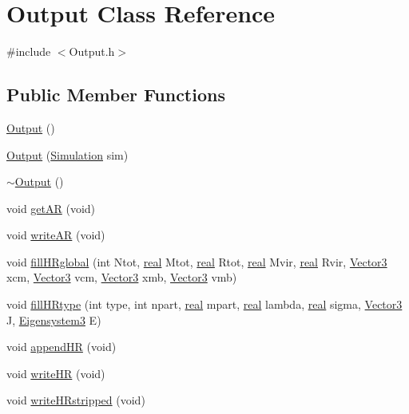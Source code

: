 \section{Output Class Reference}
\label{classOutput}


{\ttfamily \#include $<$Output.h$>$}

\subsection*{Public Member Functions}
\begin{DoxyCompactItemize}
\item 
\hyperlink{classOutput_a428c663520336477a12f1a33504eb067}{Output} ()
\item 
\hyperlink{classOutput_aebd7037654639cea281a35d81ca8aaa5}{Output} (\hyperlink{classSimulation}{Simulation} sim)
\item 
\hyperlink{classOutput_a61d0840daf98bea49e4dc471f235eeab}{$\sim$Output} ()
\item 
void \hyperlink{classOutput_a17fff27847f8925c27d3a394ab7fee52}{getAR} (void)
\item 
void \hyperlink{classOutput_a4b6aca71978b0dcd4a40be86239d37f5}{writeAR} (void)
\item 
void \hyperlink{classOutput_a10e9ba492da5d302af6e295364b6da6c}{fillHRglobal} (int Ntot, \hyperlink{Global_8h_a031f8951175b43076c2084a6c2173410}{real} Mtot, \hyperlink{Global_8h_a031f8951175b43076c2084a6c2173410}{real} Rtot, \hyperlink{Global_8h_a031f8951175b43076c2084a6c2173410}{real} Mvir, \hyperlink{Global_8h_a031f8951175b43076c2084a6c2173410}{real} Rvir, \hyperlink{classVector3}{Vector3} xcm, \hyperlink{classVector3}{Vector3} vcm, \hyperlink{classVector3}{Vector3} xmb, \hyperlink{classVector3}{Vector3} vmb)
\item 
void \hyperlink{classOutput_aee8f2718ff8e649941e3a7b9612e2a73}{fillHRtype} (int type, int npart, \hyperlink{Global_8h_a031f8951175b43076c2084a6c2173410}{real} mpart, \hyperlink{Global_8h_a031f8951175b43076c2084a6c2173410}{real} lambda, \hyperlink{Global_8h_a031f8951175b43076c2084a6c2173410}{real} sigma, \hyperlink{classVector3}{Vector3} J, \hyperlink{classEigensystem3}{Eigensystem3} E)
\item 
void \hyperlink{classOutput_a71850dc1d6b1910f23554a658dbdaf43}{appendHR} (void)
\item 
void \hyperlink{classOutput_adbb20b34ba5579ab43ec53b242219a7d}{writeHR} (void)
\item 
void \hyperlink{classOutput_abcbbba75272c18b1bb8e50de77d17dd6}{writeHRstripped} (void)
\end{DoxyCompactItemize}


